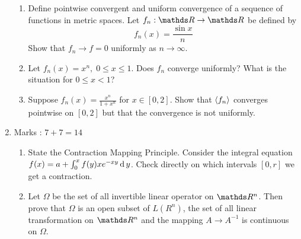 \documentclass[../main-sheet.tex]{subfiles}
\begin{document}
\begin{enumerate}
        \begin{enumerate}
            \item Define pointwise convergent and uniform convergence of a sequence of functions in metric spaces. Let $ f_n:\R\to\R  $ be defined by 
            \[
                f_n(x)=\frac{\sin x}{n}
            \]
            Show that $ f_n\to f=0 $ uniformly as $ n\to \infty $.
            \item Let $ f_n(x)=x^n,\;0\leq x\leq 1 $. Does $ f_n $ converge uniformly? What is the situation for $ 0\leq x<1 $?
            \item Suppose $ f_n(x)=\frac{x^n}{1+x^n} $ for $ x\in[0,2] $. Show that $ \left<f_n\right> $ converges pointwise on $ [0,2] $ but that the convergence is not uniformly.
        \end{enumerate}
    \item Marks : $ 7+7=14 $
        \begin{enumerate}
            \item State the Contraction Mapping Principle. Consider the integral equation\\ $ f(x)=a+\int_0^x f(y)xe^{-xy}\,\mathrm{d}\, y $. Check directly on which intervals $ [0,r] $ we get a contraction.
            \item Let $ \Omega $ be the set of all invertible linear operator on $ \R^n $. Then prove that $ \Omega $ is an open subset of $ L(R^n) $, the set of all linear transformation on $ \R^n $ and the mapping $ A\to A^{-1} $ is continuous on $ \Omega $.
        \end{enumerate}
\end{enumerate}
\end{document}
